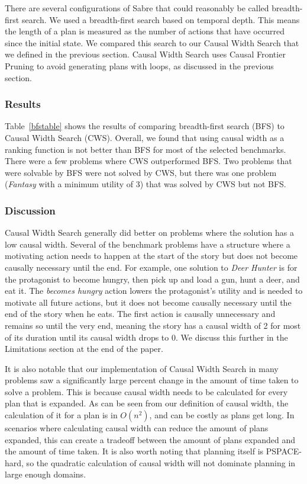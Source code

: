 \documentclass[letterpaper]{article} %
\begin{document}
There are several configurations of Sabre that could reasonably be called breadth-first search. We used a breadth-first search based on temporal depth. This means the length of a plan is measured as the number of actions that have occurred since the initial state. We compared this search to our Causal Width Search that we defined in the previous section. Causal Width Search uses Causal Frontier Pruning to avoid generating plans with loops, as discussed in the previous section.

\subsubsection{Results}

Table~\ref{bfstable} shows the results of comparing breadth-first search (BFS) to Causal Width Search (CWS). Overall, we found that using causal width as a ranking function is not better than BFS for most of the selected benchmarks. There were a few problems where CWS outperformed BFS. Two problems that were solvable by BFS were not solved by CWS, but there was one problem (\textit{Fantasy} with a minimum utility of 3) that was solved by CWS but not BFS.

\subsubsection{Discussion}

Causal Width Search generally did better on problems where the solution has a low causal width. Several of the benchmark problems have a structure where a motivating action needs to happen at the start of the story but does not become causally necessary until the end. For example, one solution to \textit{Deer Hunter} is for the protagonist to become hungry, then pick up and load a gun, hunt a deer, and eat it. The \textit{becomes hungry} action lowers the protagonist's utility and is needed to motivate all future actions, but it does not become causally necessary until the end of the story when he eats. The first action is causally unnecessary and remains so until the very end, meaning the story has a causal width of 2 for most of its duration until its causal width drops to 0. We discuss this further in the Limitations section at the end of the paper.

It is also notable that our implementation of Causal Width Search in many problems saw a significantly large percent change in the amount of time taken to solve a problem. This is because causal width needs to be calculated for every plan that is expanded. As can be seen from our definition of causal width, the calculation of it for a plan is in $O(n^2)$, and can be costly as plans get long. In scenarios where calculating causal width can reduce the amount of plans expanded, this can create a tradeoff between the amount of plans expanded and the amount of time taken. It is also worth noting that planning itself is PSPACE-hard, so the quadratic calculation of causal width will not dominate planning in large enough domains.
\end{document}
